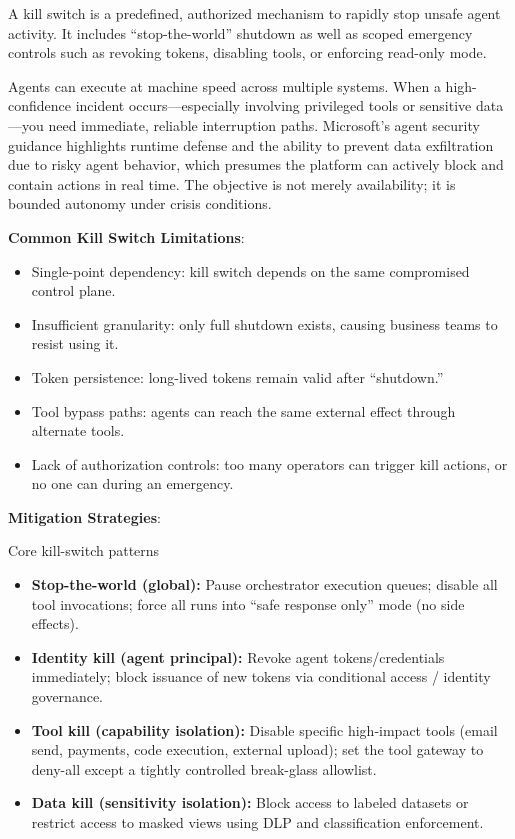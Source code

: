 \begin{TNtwocol}
    A kill switch is a predefined, authorized mechanism to rapidly stop unsafe agent activity. It includes “stop-the-world” shutdown as well as scoped emergency controls such as revoking tokens, disabling tools, or enforcing read-only mode.

    Agents can execute at machine speed across multiple systems. When a high-confidence incident occurs—especially involving privileged tools or sensitive data—you need immediate, reliable interruption paths. Microsoft's agent security guidance highlights runtime defense and the ability to prevent data exfiltration due to risky agent behavior, which presumes the platform can actively block and contain actions in real time.  The objective is not merely availability; it is bounded autonomy under crisis conditions.

    \textbf{Common Kill Switch Limitations}:
    \begin{itemize}
        \item Single-point dependency: kill switch depends on the same compromised control plane.
        \item Insufficient granularity: only full shutdown exists, causing business teams to resist using it.
        \item Token persistence: long-lived tokens remain valid after “shutdown.”
        \item Tool bypass paths: agents can reach the same external effect through alternate tools.
        \item Lack of authorization controls: too many operators can trigger kill actions, or no one can during an emergency.
    \end{itemize}

    \textbf{Mitigation Strategies}:

    Core kill-switch patterns

    \begin{itemize}
        \item \textbf{Stop-the-world (global):} Pause orchestrator execution queues; disable all tool invocations; force all runs into ``safe response only'' mode (no side effects).
        \item \textbf{Identity kill (agent principal):} Revoke agent tokens/credentials immediately; block issuance of new tokens via conditional access / identity governance.
        \item \textbf{Tool kill (capability isolation):} Disable specific high-impact tools (email send, payments, code execution, external upload); set the tool gateway to deny-all except a tightly controlled break-glass allowlist.
        \item \textbf{Data kill (sensitivity isolation):} Block access to labeled datasets or restrict access to masked views using DLP and classification enforcement.
    \end{itemize}



\end{TNtwocol}
